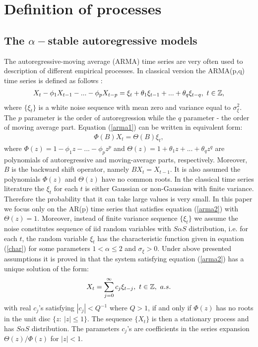 \section{Definition of \stab processes}
\subsection{The $\alpha-$stable autoregressive models}
The autoregressive-moving average (ARMA) time series are very often used to description of different empirical processes. In classical version the ARMA(p,q) time series is defined as follows \cite{brockwell2016introduction}:
\begin{eqnarray}\label{arma1}
X_t-\phi_1X_{t-1}-...-\phi_pX_{t-p}=\xi_t+\theta_1\xi_{t-1}+...+\theta_q\xi_{t-q},~t\in \operatorname{\mathbb{Z}},
\end{eqnarray}
where $\{\xi_t\}$ is a white noise sequence with mean zero and variance equal to $\sigma_{\xi}^2$. The $p$ parameter is the order of autoregression while the $q$ parameter - the order of moving average part. Equation (\ref{arma1}) can be written in equivalent form:
\begin{eqnarray}\label{arma2}
\Phi(B)X_t=\Theta(B)\xi_t,
\end{eqnarray}
where $\Phi(z)=1-\phi_1z-...-\phi_pz^p$ and $\Theta(z)=1+\theta_1z+...+\theta_qz^q$ are polynomials of autoregressive and moving-average parts, respectively. Moreover, $B$ is the backward shift operator, namely $BX_t=X_{t-1}$.  It is also assumed the polynomials $\Phi(z)$ and $\Theta(z)$ have no common roots. In the classical time series literature the $\xi_t$ for each $t$ is either Gaussian or non-Gaussian with finite variance. Therefore the probability that it can take large values is very small. In this paper we focus only on the AR(p) time series that satisfies equation (\ref{arma2}) with $\Theta(z)=1$. Moreover, instead of finite variance sequence $\{\xi_t\}$ we assume the noise constitutes sequence of iid random variables with $S\alpha S$ distribution, i.e. for each $t$, the random variable $\xi_t$ has the characteristic function given in equation (\ref{char}) for some parameters $1<\alpha\leq 2$ and $\sigma_{\xi}>0$. Under above presented assumptions it is proved in \cite{stable} that the system satisfying equation (\ref{arma2}) has a unique solution of the form:
\begin{eqnarray*}\label{sol}
X_t=\sum_{j=0}^{\infty}c_j\xi_{t-j}, ~t\in \operatorname{\mathbb{Z}},~a.s.
\end{eqnarray*}
with real $c_j$'s satisfying $|c_j|<Q^{-1}$ where $Q>1$, if and only if $\Phi(z)$ has no roots in the unit disc $\{z:~|z|\leq 1\}$. The sequence $\{X_t\}$ is then a stationary process and has $S\alpha S$ distribution. The parameters $c_j$'s are coefficients in the series expansion $\Theta(z)/\Phi(z)$ for $|z|<1$.


